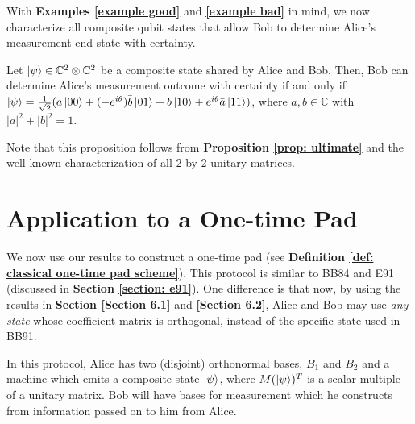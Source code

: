 With {\bf{Examples} \ref{example good}} and \textbf{\ref{example bad}} in mind, we now characterize all composite qubit states that allow Bob to determine Alice's measurement end state with certainty.  
\begin{prop}
\label{classification}
Let $\ket{\psi} \in {\mathbb{C}}^2 \otimes {\mathbb{C}}^2$ be a composite state shared by Alice and Bob.  Then, Bob can determine Alice's measurement outcome with certainty if and only if $\ket{\psi}=\frac{1}{\sqrt{2}}(a\ket{00}+(-e^{i\theta})\Bar{b}\ket{01}+b\ket{10}+e^{i\theta}\Bar{a}\ket{11})$, where $a, b \in \mathbb{C}$ with $|a|^2+|b|^2=1$.
\end{prop}
Note that this proposition follows from {\bf{Proposition} \ref{prop: ultimate}} and the well-known characterization of all $2$ by $2$ unitary matrices.


\pagebreak

\section{Application to a One-time Pad}\label{section: application to a one-time pad}


We now use our results to construct a one-time pad (see \textbf{Definition \ref{def: classical one-time pad scheme}}). This protocol is similar to BB84 and E91 (discussed in \textbf{Section \ref{section: e91}}).  One difference is that now, by using the results in {\bf{Section} \ref{Section 6.1}} and \textbf{\ref{Section 6.2}}, Alice and Bob may use {\emph{any state}} whose coefficient matrix is orthogonal, instead of the specific state used in BB91.  


\begin{comment}
\begin{figure}[h]
    \centering
    \texttt{[image: "protocol diagram".png]}
    \label{fig:protocol diagram}
\end{figure}
\end{comment}

In this protocol, Alice has two (disjoint) orthonormal bases, $B_1$ and $B_2$ and a machine which emits a composite state $\ket{\psi}$, where $M(\ket{\psi})^T$ is a scalar multiple of a unitary matrix.  Bob will have bases for measurement which he constructs from information passed on to him from Alice.

